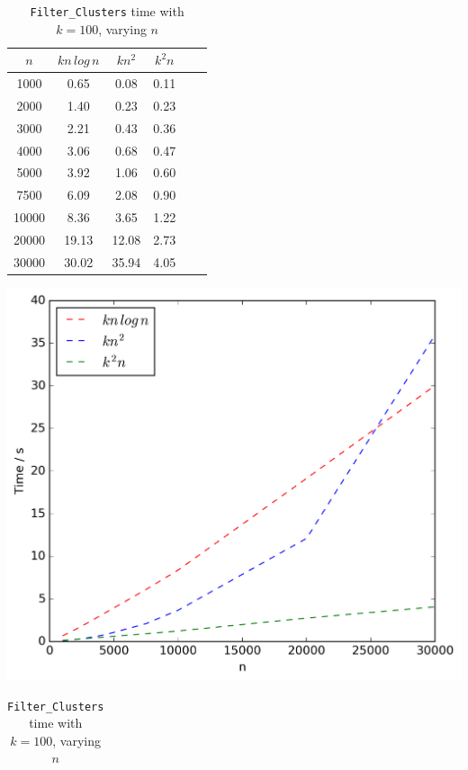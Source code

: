 \documentclass[12pt,a4paper]{article}
\begin{document}
\begin{table}[!ht]
\begin{minipage}{0.48\textwidth}
            \label{tab:weightn1}
            \begin{tabular}{c||ccccc}
                $n$ & $kn\,log\,n$ & $kn^2$ & $k^2n$\\
                \hline\hline
                1000 & 0.65 & 0.08 & 0.11\\
                2000 & 1.40 & 0.23 & 0.23\\
                3000 & 2.21 & 0.43 & 0.36\\
                4000 & 3.06 & 0.68 & 0.47\\
                5000 & 3.92 & 1.06 & 0.60\\
                7500 & 6.09 & 2.08 & 0.90\\
                10000 & 8.36 & 3.65 & 1.22\\
                20000 & 19.13 & 12.08 & 2.73\\
                30000 & 30.02 & 35.94 & 4.05\\
            \end{tabular}
            \includegraphics[scale=0.4]{varyingn1_weighting}
        \end{minipage}\hfill
        \begin{minipage}{0.48\textwidth}
            \centering
            \caption[Runtime of \texttt{Filter\_Clusters} in Scenario 1, with $k = 100$ and varying $n$]{\texttt{Filter\_Clusters} time with $k = 100$, varying $n$}
            \label{tab:filtern1}
            \begin{tabular}{c||ccccc}

\end{tabular}
\end{minipage}
\end{table}
\end{document}

